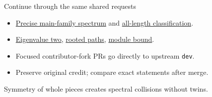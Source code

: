 \documentclass{beamer}
\begin{document}
\begin{frame}{Continue through the same shared requests}
\begin{itemize}
\item \href{https://github.com/the-omega-institute/trureturing-requests/issues/39}{Precise main-family spectrum} and \href{https://github.com/the-omega-institute/trureturing-requests/issues/40}{all-length classification}.
\item \href{https://github.com/the-omega-institute/trureturing-requests/issues/41}{Eigenvalue two}, \href{https://github.com/the-omega-institute/trureturing-requests/issues/42}{rooted paths}, \href{https://github.com/the-omega-institute/trureturing-requests/issues/43}{module bound}.
\item Focused contributor-fork PRs go directly to upstream \texttt{dev}.
\item Preserve original credit; compare exact statements after merge.
\end{itemize}
Symmetry of whole pieces creates spectral collisions without twins.
\end{frame}
\appendix
\end{document}
